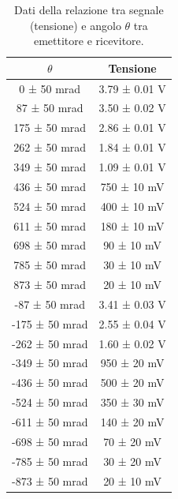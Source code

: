 \documentclass[a4paper]{article}
\begin{document}
\begin{table}[htbp]
\centering
\begin{tabular}{|c|c|}
\hline
$\theta$ & Tensione \\\hline\hline
0 ± 50 mrad & 3.79 ± 0.01 V \\
87 ± 50 mrad & 3.50 ± 0.02 V \\
175 ± 50 mrad & 2.86 ± 0.01 V \\
262 ± 50 mrad & 1.84 ± 0.01 V \\
349 ± 50 mrad & 1.09 ± 0.01 V \\
436 ± 50 mrad & 750 ± 10 mV \\
524 ± 50 mrad & 400 ± 10 mV \\
611 ± 50 mrad & 180 ± 10 mV \\
698 ± 50 mrad & 90 ± 10 mV \\
785 ± 50 mrad & 30 ± 10 mV \\
873 ± 50 mrad & 20 ± 10 mV \\
-87 ± 50 mrad & 3.41 ± 0.03 V \\
-175 ± 50 mrad & 2.55 ± 0.04 V \\
-262 ± 50 mrad & 1.60 ± 0.02 V \\
-349 ± 50 mrad & 950 ± 20 mV \\
-436 ± 50 mrad & 500 ± 20 mV \\
-524 ± 50 mrad & 350 ± 30 mV \\
-611 ± 50 mrad & 140 ± 20 mV \\
-698 ± 50 mrad & 70 ± 20 mV \\
-785 ± 50 mrad & 30 ± 20 mV \\
-873 ± 50 mrad & 20 ± 10 mV \\
\hline
\end{tabular}
\caption{Dati della relazione tra segnale (tensione) e angolo $\theta$ tra emettitore e ricevitore.}
\label{tab:dati_ampgeom_angolo}
\end{table}
\end{document}
